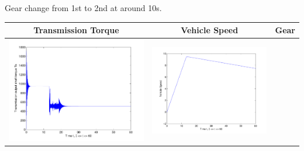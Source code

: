 \documentclass{seminar}
\begin{document}
\begin{slide}
Gear change from 1st to 2nd at around 10s.
\end{slide}
\begin{slide}
\begin{tabular}{ccc}
Transmission Torque & Vehicle Speed & Gear
\\ \hline
\includegraphics[angle=0,scale=0.22]{Ts-tps50-grade1} &
\includegraphics[angle=0,scale=0.22]{V-tps50-grade1} &

\end{tabular}
\end{slide}
\end{document}
